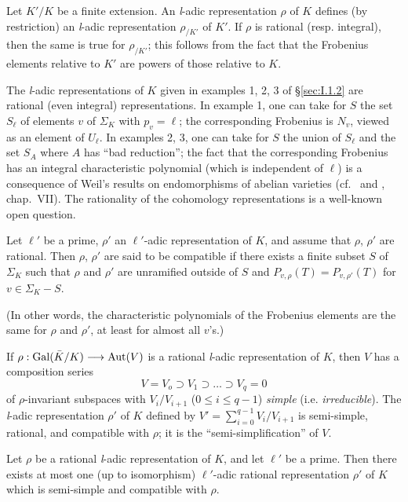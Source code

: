 
Let $K'/K$ be a finite extension.  An \textit{l}-adic representation
$\rho$ of $K$ defines (by restriction) an \textit{l}-adic
representation $\rho_{/K'}$ of $K'$.  If $\rho$ is rational
(resp. integral), then the same is true for $\rho_{/K'}$; this follows
from the fact that the Frobenius elements relative to $K'$ are powers
of those relative to $K$.

\begin{examples}
The \textit{l}-adic representations of $K$ given in examples 1, 2, 3
of \S\ref{sec:I.1.2} are rational (even integral) representations.  In
example 1, one can take for $S$ the set $S_\ell$ of elements $v$ of
$\Sigma_K$ with $p_v = \ell$; the corresponding Frobenius is $N_v$,
viewed as an element of $U_\ell$.  In examples 2, 3, one can take for
$S$ the union of $S_\ell$ and the set $S_A$ where $A$ has ``bad
reduction''; the fact that the corresponding Frobenius has an integral
characteristic polynomial (which is independent of $\ell$) is a
consequence of Weil's results on endomorphisms of abelian varieties
(cf.~\cite{weil-abelian} and \cite{lang-abelian}, chap.~VII).  The
rationality of the cohomology representations is a well-known open
question.
\end{examples}

\begin{dfn}
Let $\ell'$ be a prime, $\rho'$ an $\ell'$-adic representation of $K$,
and assume that $\rho$, $\rho'$ are rational.  Then $\rho$, $\rho'$
are said to be compatible if there exists a finite subset $S$ of
$\Sigma_K$ such that $\rho$ and $\rho'$ are unramified outside of $S$
and $P_{v,\rho}(T) = P_{v,\rho'}(T)$ for $v \in \Sigma_K - S$.
\end{dfn}

(In other words, the characteristic polynomials of the Frobenius
elements are the same for $\rho$ and $\rho'$, at least for almost all
$v$'s.)

If $\rho : \mathrm{Gal}(\bar{K}/K) \longrightarrow \mathrm{Aut}(V)$ is a rational
\textit{l}-adic representation of $K$, then $V$ has a composition
series
\[
V = V_o \supset V_1 \supset \ldots \supset V_q = 0
\]
of $\rho$-invariant subspaces with $V_i/V_{i+1}$ ($0 \leq i \leq q-1$)
\emph{simple} (i.e. \emph{irreducible}).  The \textit{l}-adic
representation $\rho'$ of $K$ defined by
$V' = \sum\limits_{i=0}^{q-1} V_i/V_{i+1}$ is semi-simple, rational,
and compatible with $\rho$; it is the ``semi-simplification'' of $V$.

\begin{theorem}\label{thm:I.2.3.unnum}
Let $\rho$ be a rational \textit{l}-adic representation of $K$, and
let $\ell'$ be a prime.  Then there exists at most one (up to
isomorphism) $\ell'$-adic rational representation $\rho'$ of $K$ which
is semi-simple and compatible with $\rho$.
\end{theorem}

